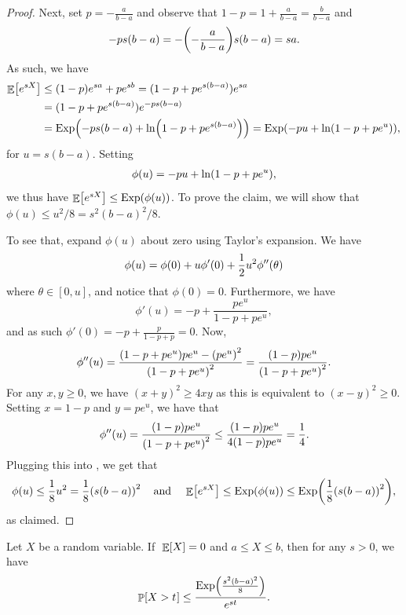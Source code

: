 \begin{proof}
    
    Next, set $\displaystyle p = - \frac{a}{b-a}$ and observe that
    $\displaystyle 1-p = 1 + \frac{a}{b-a} = \frac{b}{b-a}$ and
    \begin{align*}
    -ps(b-a) = - \pth{- \frac{ a}{b-a}} s (b-a) = sa .
    \end{align*}
    As such, we have
    \begin{align*}        
        \Ex{e^{sX}}%
        &\leq  (1-p)e^{sa} + p e^{sb} 
        =%
        (1-p+p e^{s(b-a)}) e^{sa} \\
        &=%
        (1-p+p e^{s(b-a)}) e^{-ps(b-a)} \\%
        &=%
        \Exp \pth{ -ps(b-a) + \ln\pth{ 1-p+p e^{s(b-a)} }} 
        = \Exp \pth{ -p u + \ln\pth{ 1-p+p e^{u} }},
    \end{align*}
    for $u = s(b-a)$. Setting
    \begin{align*} 
        \phi(u) = -pu + \ln\pth{1-p+pe^{u}},
    \end{align*}
    we thus have $\Ex{e^{sX}} \leq \Exp \pth{ \phi(u) }$.  To prove
    the claim, we will show that $\displaystyle \phi(u) \le {u^{2}} /
    {8} = {s^{2}(b-a)^{2}} / {8}$.
    
    To see that, expand $\phi(u)$ about zero using Taylor's
    expansion. We have 
    \begin{equation}
        \phi(u) = \phi(0)+u\phi'(0)+\frac{1}{2}u^{2}\phi''(\theta)
        \eqlab{phi:u}
    \end{equation}
    where $\theta\in [0,u]$, and notice
    that $\phi(0)=0$.
    Furthermore, we have
    \[
    \phi'(u) = -p + \frac{pe^u}{1-p + pe^u},
    \]
    and as such $\phi'(0) = -p + \frac{p}{1-p + p } = 0$.
    Now,
    \[
    \phi''(u) = \frac{\pth{ 1-p + pe^u}pe^u - \pth{pe^u}^2 }{\pth{1-p
          + pe^u}^2} = \frac{\pth{ 1-p}pe^u }{\pth{1-p + pe^u}^2}.
    \]
    For any $x, y \geq 0$, we have $(x+y)^2 \geq 4xy$ as this is
    equivalent to $(x-y)^2 \geq 0$. Setting $x = 1-p$ and $y = pe^u$,
    we have that
    \[
    \phi''(u) = 
    \frac{\pth{ 1-p}pe^u }{\pth{1-p + pe^u}^2}
    \leq 
    \frac{\pth{ 1-p}pe^u }{4\pth{ 1-p}pe^u} = \frac{1}{4}.
    \]
    Plugging this into , we get that
    \[
    \phi(u) \leq \frac{1}{8}u^{2} = \frac{1}{8}\pth{s(b-a)}^{2} \;\;\;
    \text{ and } \;\;\; \Ex{e^{sX}} \leq \Exp \pth{ \phi(u) } \leq
    \Exp\pth{ \frac{1}{8}\pth{s(b-a)}^{2}},
    \]
    as claimed.
\end{proof}

\begin{lemma}
    Let $X$ be a random variable.
    If $\;\mathop{\mathbb{E}}\!\left[ {X} \right]=0$ and $a\le X\le b$, then for any $s > 0$, we have
    \[ 
    \Prob{ X > t \MakesBig\ts }%
    \leq%
    \frac{\Exp \pth{\frac{s^{2}(b-a)^{2}}{8}}} {e^{st}}.
    \]
\end{lemma}

